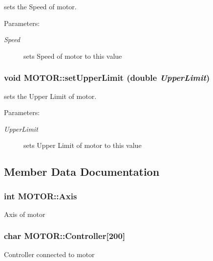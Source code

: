 sets the Speed of motor. \begin{Desc}
\item[Parameters:]
\begin{description}
\item[{\em Speed}]sets Speed of motor to this value \end{description}
\end{Desc}
\subsubsection{\setlength{\rightskip}{0pt plus 5cm}void MOTOR::set\-Upper\-Limit (double {\em Upper\-Limit})}\label{classMOTOR_88a3dcbe4fe62e4b9c2b30f43c0dcad0}


sets the Upper Limit of motor. \begin{Desc}
\item[Parameters:]
\begin{description}
\item[{\em Upper\-Limit}]sets Upper Limit of motor to this value \end{description}
\end{Desc}


\subsection{Member Data Documentation}
\subsubsection{\setlength{\rightskip}{0pt plus 5cm}int \bf{MOTOR::Axis}\hspace{0.3cm}{\tt  [private]}}\label{classMOTOR_0a6b5898f76de82f2abb4f7ff5e64b9d}


Axis of motor 
\subsubsection{\setlength{\rightskip}{0pt plus 5cm}char \bf{MOTOR::Controller}[200]\hspace{0.3cm}{\tt  [private]}}\label{classMOTOR_385aaa1d4e1c5e6605c209fdf468f598}


Controller connected to motor 
